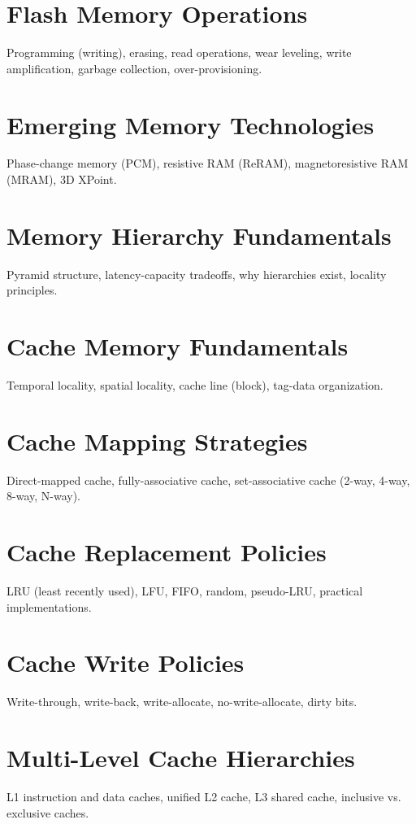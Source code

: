 \chapter{Flash Memory Operations}
Programming (writing), erasing, read operations, wear leveling, write amplification, garbage collection, over-provisioning.

\chapter{Emerging Memory Technologies}
Phase-change memory (PCM), resistive RAM (ReRAM), magnetoresistive RAM (MRAM), 3D XPoint.


\chapter{Memory Hierarchy Fundamentals}
Pyramid structure, latency-capacity tradeoffs, why hierarchies exist, locality principles.

\chapter{Cache Memory Fundamentals}
Temporal locality, spatial locality, cache line (block), tag-data organization.

\chapter{Cache Mapping Strategies}
Direct-mapped cache, fully-associative cache, set-associative cache (2-way, 4-way, 8-way, N-way).

\chapter{Cache Replacement Policies}
LRU (least recently used), LFU, FIFO, random, pseudo-LRU, practical implementations.

\chapter{Cache Write Policies}
Write-through, write-back, write-allocate, no-write-allocate, dirty bits.

\chapter{Multi-Level Cache Hierarchies}
L1 instruction and data caches, unified L2 cache, L3 shared cache, inclusive vs. exclusive caches.

